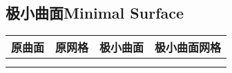 \documentclass[14pt]{scrartcl} %
\begin{document}
	\subsection{极小曲面Minimal Surface}
	\begin{table}[h] %
		\centering %
		\begin{tabular}{l l l l}
			\toprule
			\centering
			\textbf{原曲面} & \textbf{原网格} & \textbf{极小曲面} &\textbf{极小曲面网格}\\
			\midrule
			\begin{minipage}[t]{0.2\linewidth}
				\centering
			\end{minipage}&
			\begin{minipage}[t]{0.2\linewidth}
				\centering
			\end{minipage}&
			\begin{minipage}[t]{0.2\linewidth}
				\centering
			\end{minipage}&
			\begin{minipage}[t]{0.2\linewidth}
				\centering
			\end{minipage}\\
			\begin{minipage}[t]{0.2\linewidth}
				\centering
			\end{minipage}&
			\begin{minipage}[t]{0.2\linewidth}
				\centering
			\end{minipage}&
			\begin{minipage}[t]{0.2\linewidth}
				\centering
			\end{minipage}&
			\begin{minipage}[t]{0.2\linewidth}
				\centering
			\end{minipage}\\
			

\end{tabular}
\end{table}
\end{document}
